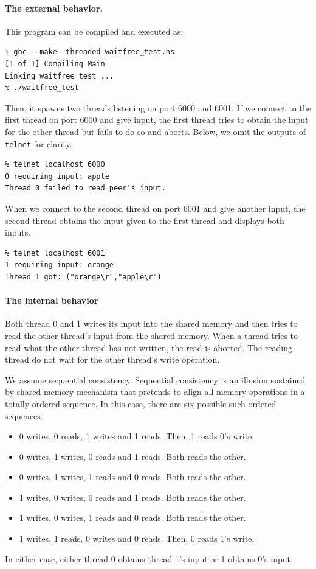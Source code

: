 \documentclass[doctor]{iscs-thesis}
\begin{document}
\paragraph{The external behavior.}
  This program can be compiled and executed as:
\begin{verbatim}
% ghc --make -threaded waitfree_test.hs
[1 of 1] Compiling Main
Linking waitfree_test ...
% ./waitfree_test
\end{verbatim}
Then, it spawns two threads listening on port 6000 and 6001.  If we
connect to the first thread on port 6000 and
give input, the first thread tries to obtain the input for the other
thread but fails to do so and aborts.  Below, we omit the outputs of
\texttt{telnet} for clarity.
\begin{verbatim}
% telnet localhost 6000
0 requiring input: apple
Thread 0 failed to read peer's input.
\end{verbatim}
When we connect to the second thread on port 6001 and give another
input,
the second thread obtains the input given to the first thread and displays
both inputs.
\begin{verbatim}
% telnet localhost 6001
1 requiring input: orange
Thread 1 got: ("orange\r","apple\r")
\end{verbatim}

\paragraph{The internal behavior}

Both thread 0 and 1 writes its input into the shared memory and then
tries to read the other thread's input from the shared memory.  When
a thread tries to read what the other thread has not written, the read
is aborted.  The reading thread do not wait for the other thread's write
operation.

We assume sequential consistency.  Sequential consistency is an illusion
sustained by shared memory mechanism that pretends to align all memory
operations in a totally ordered sequence.  In this case, there are
six possible such ordered sequences.
\begin{itemize}
 \item 0 writes, 0 reads, 1 writes and 1 reads.  Then, 1 reads 0's write.
 \item 0 writes, 1 writes, 0 reads and 1 reads.  Both reads the other.
 \item 0 writes, 1 writes, 1 reads and 0 reads.  Both reads the other.
 \item 1 writes, 0 writes, 0 reads and 1 reads.  Both reads the other.
 \item 1 writes, 0 writes, 1 reads and 0 reads.  Both reads the other.
 \item 1 writes, 1 reads, 0 writes and 0 reads.  Then, 0 reads 1's write.
\end{itemize}
In either case, either thread 0 obtains thread 1's input or 1 obtains
0's input.
\end{document}
